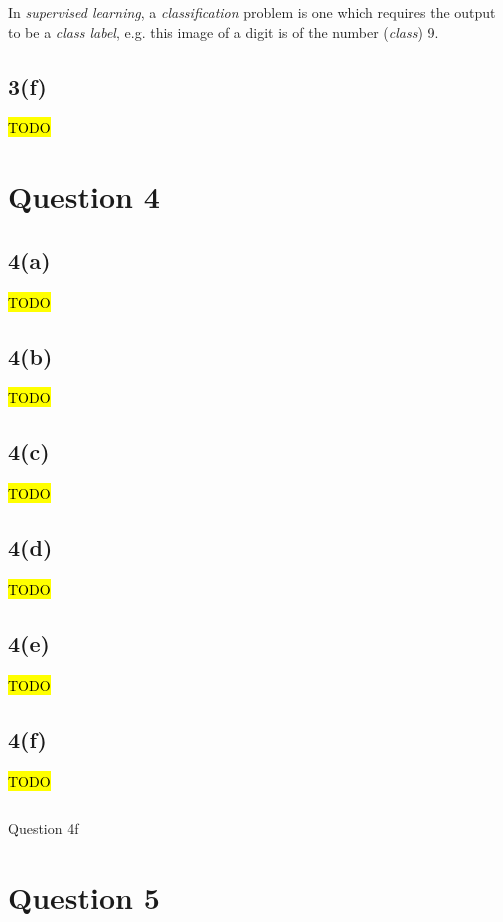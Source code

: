\documentclass[12pt, a4paper,reqno]{article}
\begin{document}
In \emph{supervised learning}, a \emph{classification} problem is one which requires the output to be a \emph{class label}, e.g. this image of a digit is of the number (\emph{class}) 9.

\subsection*{3(f)}
\hl{TODO}


%
%
\clearpage\section*{Question 4}

\subsection*{4(a)}
\hl{TODO}

\subsection*{4(b)}
\hl{TODO}

\subsection*{4(c)}
\hl{TODO}

\subsection*{4(d)}
\hl{TODO}

\subsection*{4(e)}
\hl{TODO}

\subsection*{4(f)}
\hl{TODO}

\begin{listing}
\inputminted[linenos]{python}{question_4f.py}
\caption{Question 4f}
\end{listing}



%
%
\clearpage\section*{Question 5}
\end{document}
